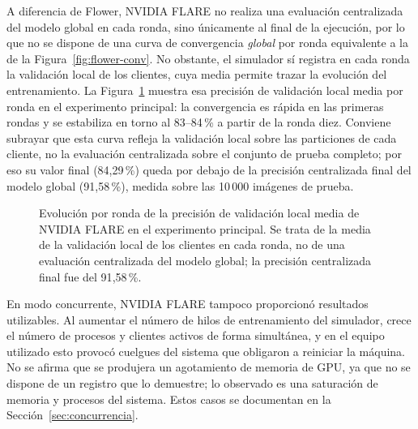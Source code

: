 A diferencia de Flower, NVIDIA FLARE no realiza una evaluación centralizada del modelo global en
cada ronda, sino únicamente al final de la ejecución, por lo que no se dispone de una curva de
convergencia \emph{global} por ronda equivalente a la de la Figura~\ref{fig:flower-conv}. No
obstante, el simulador sí registra en cada ronda la validación local de los clientes, cuya media
permite trazar la evolución del entrenamiento. La Figura~\ref{fig:nvflare-conv} muestra esa
precisión de validación local media por ronda en el experimento principal: la convergencia es
rápida en las primeras rondas y se estabiliza en torno al 83--84\,\% a partir de la ronda diez.
Conviene subrayar que esta curva refleja la validación local sobre las particiones de cada
cliente, no la evaluación centralizada sobre el conjunto de prueba completo; por eso su valor
final (84{,}29\,\%) queda por debajo de la precisión centralizada final del modelo global
(91{,}58\,\%), medida sobre las 10\,000 imágenes de prueba.

\begin{figure}[htbp]
  \centering
  \caption{Evolución por ronda de la precisión de validación local media de NVIDIA FLARE en el
  experimento principal. Se trata de la media de la validación local de los clientes en cada
  ronda, no de una evaluación centralizada del modelo global; la precisión centralizada final
  fue del 91{,}58\,\%.}
  \label{fig:nvflare-conv}
\end{figure}

En modo concurrente, NVIDIA FLARE tampoco proporcionó resultados utilizables. Al aumentar el
número de hilos de entrenamiento del simulador, crece el número de procesos y clientes activos
de forma simultánea, y en el equipo utilizado esto provocó cuelgues del sistema que obligaron a
reiniciar la máquina. No se afirma que se produjera un agotamiento de memoria de GPU, ya que no
se dispone de un registro que lo demuestre; lo observado es una saturación de memoria y procesos
del sistema. Estos casos se documentan en la Sección~\ref{sec:concurrencia}.

